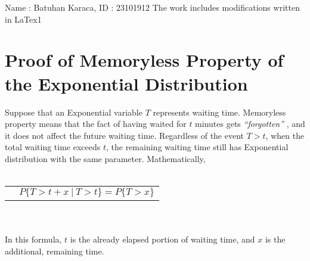 \documentclass[]{panel}
\newcommand{\Items}{Name : Batuhan Karaca, ID : 2310191}
\newcommand{\ItemCount}{2}
\newcommand{\Itemzzz}{The work includes modifications written in LaTex}
\newcommand{\ItemCounT}{1}
\begin{document}
\Items\ItemCount 
{}\Itemzzz\ItemCounT


\section*{Proof of Memoryless Property of the Exponential Distribution}
Suppose that an Exponential variable $T$ represents waiting time. Memoryless 
property means that the fact of having waited for $t$ minutes gets \textit{“forgotten”} ,
and it does not affect the future waiting time. Regardless of the event $T > t$, 
when the total waiting time exceeds $t$, the remaining waiting time still has 
Exponential distribution with the same parameter.
Mathematically,
\\ \\
\begin{tabular}{l l}
    & $P\{ T>t+x\ |\ T>t \} = P\{ T>x \} $ \\
\end{tabular}
\\ \\
In this formula, $t$ is the already elapsed portion of waiting time, and $x$ is the additional,
remaining time.
\\ \\
\end{document}
